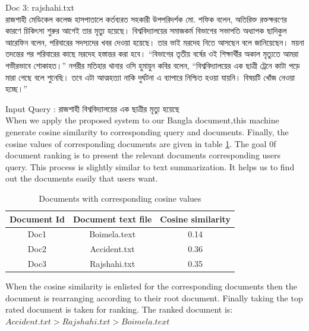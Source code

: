 Doc 3: rajshahi.txt\\
{\unicodefont রাজশাহী মেডিকেল কলেজ হাসপাতালে কর্তব্যরত সহকারী উপপরিদর্শক মো. শফিক বলেন, অতিরিক্ত রক্তক্ষরণের কারণে চিকিৎসা শুরুর আগেই তার মৃত্যু হয়েছে।  বিশ্ববিদ্যালয়ের সমাজকর্ম বিভাগের সভাপতি অধ্যাপক ছাদিকুল আরেফিন বলেন, পরিবারের সদস্যদের খবর দেওয়া হয়েছে। তার ভাই মরদেহ নিতে আসছেন বলে জানিয়েছেন। ময়না তদন্তের পর পরিবারের কাছে মরদেহ হস্তান্তর করা হবে। “বিভাগের তৃতীয় বর্ষের ওই শিক্ষার্থীর অকাল মৃত্যুতে আমরা গভীরভাবে শোকাহত।” নগরীর মতিহার থানার ওসি হুমায়ুন কবির বলেন, “বিশ্ববিদ্যালয়ের এক ছাত্রী ট্রেনে কাটা পড়ে মারা গেছে বলে শুনেছি। তবে এটা আত্মহত্যা নাকি দুর্ঘটনা এ ব্যাপারে নিশ্চিত হওয়া যায়নি। বিষয়টি খোঁজ নেওয়া হচ্ছে।”}



Input Query : {\unicodefont রাজশাহী বিশ্ববিদ্যালয়ের এক ছাত্রীর মৃত্যু হয়েছে}\\

When we apply the proposed system to our Bangla document,this machine generate cosine similarity to corresponding query and documents. Finally, the cosine values of corresponding documents are given in table \ref{tab:cosine values}. The goal 0f document ranking is to present the relevant documents corresponding users query. This process is slightly similar to text summarization. It helps us to find out the documents easily that users want.

\begin{table}[htp]	
\centering

  \caption{Documents with corresponding cosine values }
\vspace{0.5cm}
\begin{tabular}{|c|c|c|} 
\hline

	Document Id & Document text file &  Cosine similarity\\ \hline
 Doc1 & Boimela.text &	0.14   \\ \hline
 Doc2 & Accident.txt & 0.36  \\ \hline
 Doc3  & Rajshahi.txt & 0.35       \\ \hline


\end{tabular}
\label{tab:cosine values}
\end{table}



When the cosine similarity is enlisted for the corresponding documents then the document is rearranging according to their root document. Finally taking the top rated document is taken for ranking. The ranked document is:\\
		$Accident.txt > Rajshahi.txt > Boimela.text$
		
